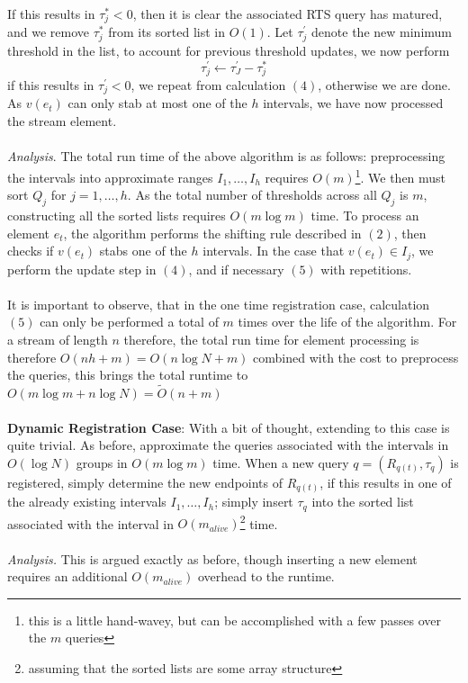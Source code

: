 \documentclass{article}
\begin{document}
If this results in $\tau_j^* < 0$, then it is clear the associated RTS query has matured, and we remove $\tau^*_j$ from its sorted list in $O(1)$. Let $\tau^\prime_j$ denote the new minimum threshold in the list, to account for previous threshold updates, we now perform
\begin{equation}
    \tau_j^\prime \leftarrow \tau_J^\prime - \tau_j^*
\end{equation}
if this results in $\tau_j^\prime <0$, we repeat from calculation $(4)$, otherwise we are done. As $v(e_t)$ can only stab at most one of the $h$ intervals, we have now processed the stream element. \\
\\
\textit{Analysis}. The total run time of the above algorithm is as follows: preprocessing the intervals into approximate ranges $I_1, \dots, I_h$ requires $O(m)$\footnote{this is a little hand-wavey, but can be accomplished with a few passes over the $m$ queries}. We then must sort $Q_j$ for $j=1,\dots,h$. As the total number of thresholds across all $Q_j$ is $m$, constructing all the sorted lists requires $O(m\log m)$ time. To process an element $e_t$, the algorithm performs the shifting rule described in $(2)$, then checks if $v(e_t)$ stabs one of the $h$ intervals. In the case that $v(e_t)\in I_j$, we perform the update step in $(4)$, and if necessary $(5)$ with repetitions. \\
\\
It is important to observe, that in the one time registration case, calculation $(5)$ can only be performed a total of $m$ times over the life of the algorithm. For a stream of length $n$ therefore, the total run time for element processing is therefore $O(nh + m) = O(n\log N + m)$ combined with the cost to preprocess the queries, this brings the total runtime to $O(m\log m + n \log N) = \tilde{O}(n+m)$ \\
\\
\textbf{Dynamic Registration Case}: With a bit of thought, extending to this case is quite trivial. As before, approximate the queries associated with the intervals in $O(\log N)$ groups in $O(m\log m)$ time. When a new query $q = (R_{q(t)}, \tau_q)$ is registered, simply determine the new endpoints of $R_{q(t)}$, if this results in one of the already existing intervals $I_1, \dots, I_h$; simply insert $\tau_q$ into the sorted list associated with the interval in $O(m_{alive})$\footnote{assuming that the sorted lists are some array structure} time. \\
\\
\textit{Analysis.} This is argued exactly as before, though inserting a new element requires an additional $O(m_{alive})$ overhead to the runtime. 
\end{document}
